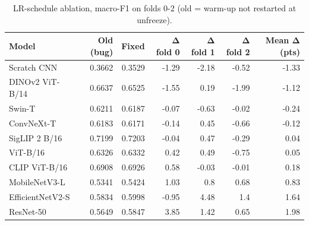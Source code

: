 \begin{table}[t]
\centering\small
\caption{LR-schedule ablation, macro-F1 on folds 0-2 (old = warm-up not restarted at unfreeze).}
\label{tab:schedule_ablation}
\begin{tabular}{lrrrrrr}
\toprule
Model & Old (bug) & Fixed & Δ fold 0 & Δ fold 1 & Δ fold 2 & Mean Δ (pts) \\
\midrule
Scratch CNN & 0.3662 & 0.3529 & -1.29 & -2.18 & -0.52 & -1.33 \\
DINOv2 ViT-B/14 & 0.6637 & 0.6525 & -1.55 & 0.19 & -1.99 & -1.12 \\
Swin-T & 0.6211 & 0.6187 & -0.07 & -0.63 & -0.02 & -0.24 \\
ConvNeXt-T & 0.6183 & 0.6171 & -0.14 & 0.45 & -0.66 & -0.12 \\
SigLIP 2 B/16 & 0.7199 & 0.7203 & -0.04 & 0.47 & -0.29 & 0.04 \\
ViT-B/16 & 0.6326 & 0.6332 & 0.42 & 0.49 & -0.75 & 0.05 \\
CLIP ViT-B/16 & 0.6908 & 0.6926 & 0.58 & -0.03 & -0.01 & 0.18 \\
MobileNetV3-L & 0.5341 & 0.5424 & 1.03 & 0.8 & 0.68 & 0.83 \\
EfficientNetV2-S & 0.5834 & 0.5998 & -0.95 & 4.48 & 1.4 & 1.64 \\
ResNet-50 & 0.5649 & 0.5847 & 3.85 & 1.42 & 0.65 & 1.98 \\
\bottomrule
\end{tabular}
\end{table}
